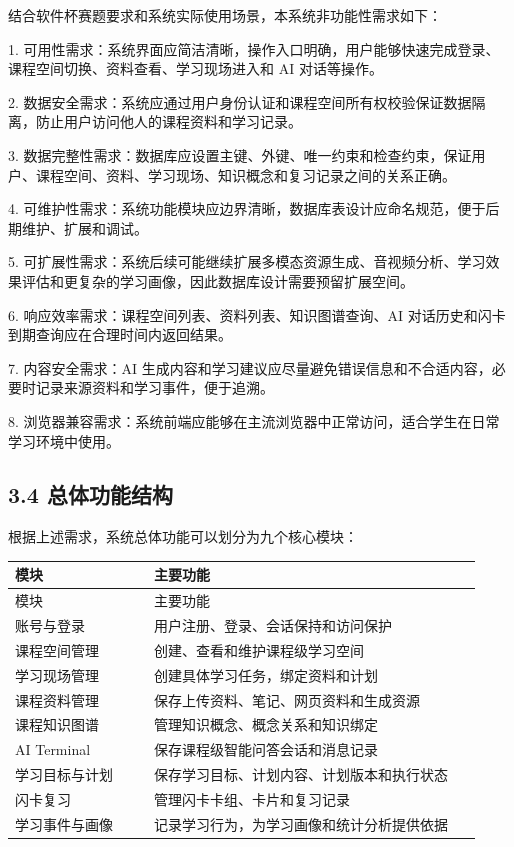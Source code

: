 \documentclass[10pt,a4paper,fontset=none]{ctexart}
\begin{document}
结合软件杯赛题要求和系统实际使用场景，本系统非功能性需求如下：\par

1. 可用性需求：系统界面应简洁清晰，操作入口明确，用户能够快速完成登录、课程空间切换、资料查看、学习现场进入和 AI 对话等操作。\par
2. 数据安全需求：系统应通过用户身份认证和课程空间所有权校验保证数据隔离，防止用户访问他人的课程资料和学习记录。\par
3. 数据完整性需求：数据库应设置主键、外键、唯一约束和检查约束，保证用户、课程空间、资料、学习现场、知识概念和复习记录之间的关系正确。\par
4. 可维护性需求：系统功能模块应边界清晰，数据库表设计应命名规范，便于后期维护、扩展和调试。\par
5. 可扩展性需求：系统后续可能继续扩展多模态资源生成、音视频分析、学习效果评估和更复杂的学习画像，因此数据库设计需要预留扩展空间。\par
6. 响应效率需求：课程空间列表、资料列表、知识图谱查询、AI 对话历史和闪卡到期查询应在合理时间内返回结果。\par
7. 内容安全需求：AI 生成内容和学习建议应尽量避免错误信息和不合适内容，必要时记录来源资料和学习事件，便于追溯。\par
8. 浏览器兼容需求：系统前端应能够在主流浏览器中正常访问，适合学生在日常学习环境中使用。\par

\subsection*{3.4 总体功能结构}

根据上述需求，系统总体功能可以划分为九个核心模块：\par

\begingroup\scriptsize
\renewcommand{\arraystretch}{1.18}
\setlength{\LTleft}{0pt}
\setlength{\LTright}{0pt}
\begin{longtable}{>{\raggedright\arraybackslash}p{0.28\linewidth}>{\raggedright\arraybackslash}p{0.66\linewidth}}
\toprule
模块 & 主要功能 \\
\midrule
\endfirsthead
\toprule
模块 & 主要功能 \\
\midrule
\endhead
账号与登录 & 用户注册、登录、会话保持和访问保护 \\
课程空间管理 & 创建、查看和维护课程级学习空间 \\
学习现场管理 & 创建具体学习任务，绑定资料和计划 \\
课程资料管理 & 保存上传资料、笔记、网页资料和生成资源 \\
课程知识图谱 & 管理知识概念、概念关系和知识绑定 \\
AI Terminal & 保存课程级智能问答会话和消息记录 \\
学习目标与计划 & 保存学习目标、计划内容、计划版本和执行状态 \\
闪卡复习 & 管理闪卡卡组、卡片和复习记录 \\
学习事件与画像 & 记录学习行为，为学习画像和统计分析提供依据 \\
\bottomrule
\end{longtable}
\endgroup
\end{document}
